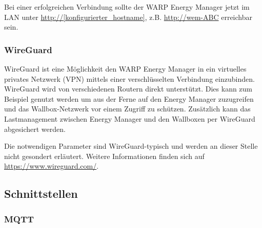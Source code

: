 \documentclass[a4paper,10pt]{article}
\newcommand{\gfx}[1]{\texttt{[image: \#1]}}
\begin{document}
\begin{multicols*}{2}
	Bei einer erfolgreichen Verbindung sollte der WARP Energy Manager jetzt im LAN unter
	\url{http://[konfigurierter_hostname]}, z.B. \url{http://wem-ABC} erreichbar sein.


	\subsubsection{WireGuard}

	WireGuard ist eine Möglichkeit den WARP Energy Manager in ein virtuelles privates Netzwerk (VPN)
	mittels einer verschlüsselten Verbindung einzubinden. WireGuard wird von
	verschiedenen Routern direkt unterstützt. Dies kann zum Beispiel genutzt
	werden um aus der Ferne auf den Energy Manager zuzugreifen und das
	Wallbox-Netzwerk vor einem Zugriff zu schützen. Zusätzlich kann das
	Lastmanagement zwischen Energy Manager und den Wallboxen per WireGuard abgesichert werden.

	Die notwendigen Parameter sind WireGuard-typisch und werden an dieser Stelle
	nicht gesondert erläutert. Weitere Informationen finden sich auf
	\url{https://www.wireguard.com/}.


	\subsection{Schnittstellen}
	\subsubsection{MQTT}
	\label{mqtt-interface}


\end{multicols*}
\end{document}
